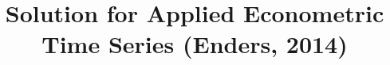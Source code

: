 \documentclass[
book,			%
11pt,				%
oneside,			%
a4paper,			%
english,			%
brazil,				%
sumario=tradicional
]{abntex2}
\title{Solution for Applied Econometric Time Series (Enders, 2014)}
\begin{document}
	
\maketitle
\mainmatter



\vspace{\onelineskip}
%
%
%
\end{document}
